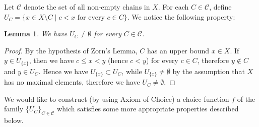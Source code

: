 \documentclass{article}
\newtheorem{lemma}{Lemma}
\begin{document}
Let $\mathcal{C}$ denote the set of all non-empty chains in $X$.
For each $C \in \mathcal{C}$, define $U_C = \{x \in X \setminus C \mid c < x \mbox{ for every } c \in C\}$.
We notice the following property:
\begin{lemma}
\label{lem:chain_has_proper_upper_bound}
We have $U_C \neq \emptyset$ for every $C \in \mathcal{C}$.
\end{lemma}
\begin{proof}
By the hypothesis of Zorn's Lemma, $C$ has an upper bound $x \in X$.
If $y \in U_{\{x\}}$, then we have $c \leq x < y$ (hence $c < y$) for every $c \in C$, therefore $y \not\in C$ and $y \in U_C$.
Hence we have $U_{\{x\}} \subset U_C$, while $U_{\{x\}} \neq \emptyset$ by the assumption that $X$ has no maximal elements, therefore we have $U_C \neq \emptyset$.
\end{proof}
We would like to construct (by using Axiom of Choice) a choice function $f$ of the family $\{U_C\}_{C \in \mathcal{C}}$ which satisfies some more appropriate properties described below.
\end{document}
